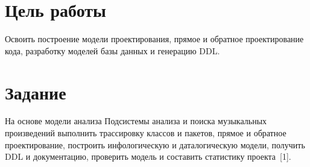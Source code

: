 \section{Цель работы}
Освоить построение модели проектирования, прямое и обратное
проектирование кода, разработку моделей базы данных и генерацию DDL.

\section{Задание}
На основе модели анализа Подсистемы анализа и поиска музыкальных произведений выполнить трассировку классов и пакетов,
прямое и обратное проектирование, построить инфологическую
и даталогическую модели, получить DDL и документацию,
проверить модель и составить статистику проекта~[1].
